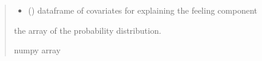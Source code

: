 \documentclass[letterpaper,10pt,english]{sphinxmanual}
\begin{document}
\begin{fulllineitems}
\begin{quote}
\begin{description}
\begin{itemize}
\item {} 
\sphinxAtStartPar
{} () \textendash{} dataframe of covariates for explaining the feeling component

\end{itemize}

\sphinxAtStartPar
the array of the probability distribution.

\sphinxAtStartPar
numpy array

\end{description}\end{quote}

\end{fulllineitems}

\end{document}
